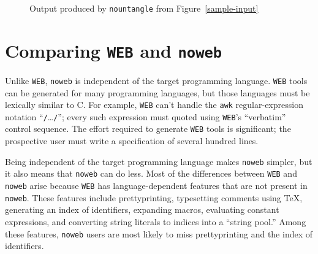 \begin{figure}
\caption{Output produced by {\tt nountangle} from
Figure~\protect\ref{sample-input}}
\label{nountangle-output}
\end{figure}




\section{Comparing {\tt WEB} and {\tt noweb}}

Unlike {\tt WEB},
\verb+noweb+ is independent of the target programming language.
{\tt WEB} tools can be generated for many programming languages, 
but those languages must be lexically similar to C.
For example, {\tt WEB} can't handle the \verb+awk+ regular-expression
notation ``\verb+/+\ldots\verb+/+''; every such expression must quoted
using {\tt WEB}'s ``verbatim'' control sequence.
The effort required to 
generate {\tt WEB} tools is significant; the prospective user must
write a specification of several hundred 
lines.

Being independent of the target programming language makes {\tt noweb}
simpler, but it also means that {\tt noweb} can do less.
Most of the differences between {\tt WEB} and {\tt noweb} arise
because {\tt WEB} has language-dependent features that are not present
in \verb+noweb+.
These features include 
prettyprinting, 
typesetting comments using {\TeX},
generating an index of identifiers, 
expanding macros, 
evaluating constant expressions, 
and 
converting string literals to indices into a ``string pool.''
Among these features, 
\verb+noweb+ users are most likely to miss prettyprinting and the
index of identifiers. 


